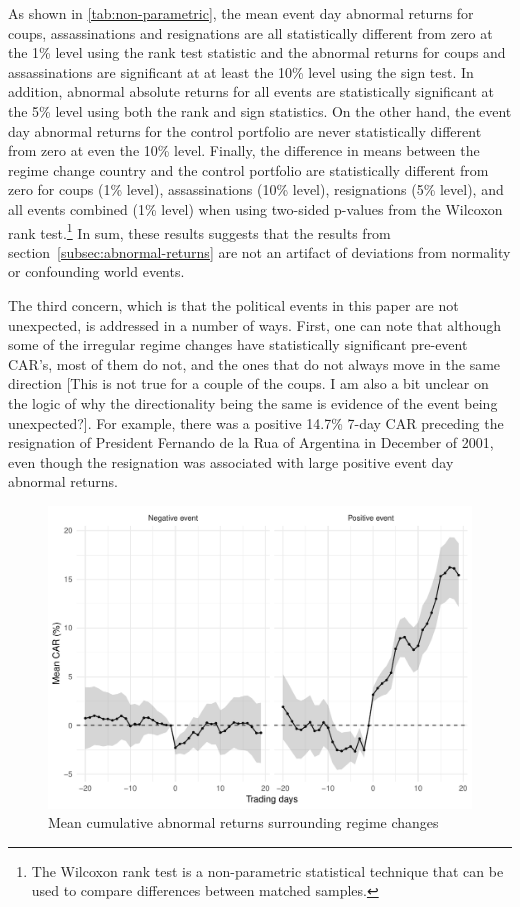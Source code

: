 \documentclass[12pt,final,fleqn]{article}
\theoremstyle{plain}
\begin{document}
As shown in \autoref{tab:non-parametric}, the mean event day abnormal returns for coups, assassinations and resignations are all statistically different from zero at the 1\% level using the rank test statistic and the abnormal returns for coups and assassinations are significant at at least the 10\% level using the sign test. In addition, abnormal absolute returns for all events are statistically significant at the 5\% level using both the rank and sign statistics. On the other hand, the event day abnormal returns for the control portfolio are never statistically different from zero at even the 10\% level. Finally, the difference in means between the regime change country and the control portfolio are statistically different from zero for coups (1\% level), assassinations (10\% level), resignations (5\% level), and all events combined (1\% level) when using two-sided p-values from the Wilcoxon rank test.\footnote{The Wilcoxon rank test is a non-parametric statistical technique that can be used to compare differences between matched samples.} In sum, these results suggests that the results from section~\autoref{subsec:abnormal-returns} are not an artifact of deviations from normality or confounding world events.

The third concern, which is that the political events in this paper are not unexpected, is addressed in a number of ways. First, one can note that although some of the irregular regime changes have statistically significant pre-event CAR's, most of them do not, and the ones that do not always move in the same direction [This is not true for a couple of the coups. I am also a bit unclear on the logic of why the directionality being the same is evidence of the event being unexpected?]. For example, there was a positive 14.7\% 7-day CAR preceding the resignation of President Fernando de la Rua of Argentina in December of 2001, even though the resignation was associated with large positive event day abnormal returns.

\begin{figure}[!ht]
\includegraphics{../figs/mean-car-pos-neg.pdf}
\caption{Mean cumulative abnormal returns surrounding regime changes}
\label{fig:CAR-mean}
\end{figure}
\end{document}
